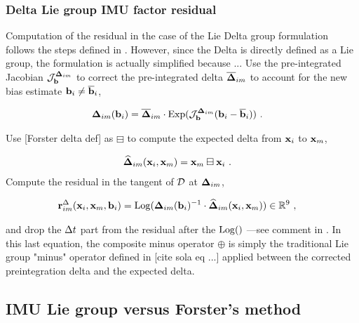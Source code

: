\subsubsection{Delta Lie group IMU factor residual}
Computation of the residual in the case of the Lie Delta group formulation follows the steps defined in .
However, since the Delta is directly defined as a Lie group, the formulation is actually simplified because  ... 
Use the pre-integrated Jacobian ${\mathcal{J}^{{{\bm \Delta}}_{im}}_{{\bf b}}}$ to correct the pre-integrated delta $\overline{{{\bm \Delta}}}_{im}$ to account for the new bias estimate ${\bf b}_i\neq\overline{{\bf b}}_i$,

\begin{align}
    {{\bm \Delta}}_{im}({\bf b}_i) &= \overline{{{\bm \Delta}}}_{im}\cdot\operatorname*{Exp}({\mathcal{J}^{{{\bm \Delta}}_{im}}_{{\bf b}}}({\bf b}_i-\overline{{\bf b}}_i)) 
    ~.
\end{align}

Use [Forster delta def]  as $\boxminus$ to compute the expected delta from  ${\bf x}_i$ to ${\bf x}_m$,

\begin{align}
    \widehat{{{\bm \Delta}}}_{im}({\bf x}_i,{\bf x}_m) &= {\bf x}_m \boxminus {\bf x}_i 
    ~.
\end{align}
Compute the residual in the  tangent of $\mathcal{D}$ at ${{\bm \Delta}}_{im}$,

\begin{align}
    {\bf r}^\Delta_{im}({\bf x}_i,{\bf x}_m,{\bf b}_i) &= \operatorname*{Log}({{\bm \Delta}}_{im}({\bf b}_i)^{-1} \cdot \widehat{{{\bm \Delta}}}_{im}({\bf x}_i,{\bf x}_m)) \in {\mathbb R}^9
~,
\end{align}

and drop the $\Delta t$ part from the residual after the $\operatorname*{Log}()$ ---see comment in .
In this last equation, the composite minus operator $\oplus$ is simply the traditional Lie group "minus" operator defined in [cite sola eq ...] applied
between the corrected preintegration delta and the expected delta.



\subsection{IMU Lie group versus Forster's method}

